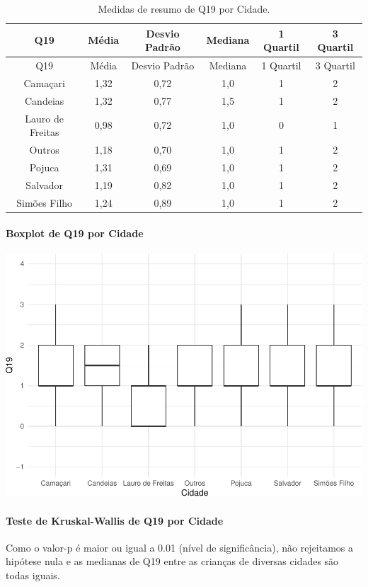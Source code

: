 \documentclass[]{article}
\let\oldparagraph\paragraph
\renewcommand{\paragraph}[1]{\oldparagraph{#1}\mbox{}}
\begin{document}
\begin{longtable}[]{@{}cccccc@{}}
\caption{\label{tab:unnamed-chunk-312}Medidas de resumo de Q19 por Cidade.}\tabularnewline
\toprule
Q19 & Média & Desvio Padrão & Mediana & 1 Quartil & 3 Quartil\tabularnewline
\midrule
\endfirsthead
\toprule
Q19 & Média & Desvio Padrão & Mediana & 1 Quartil & 3 Quartil\tabularnewline
\midrule
\endhead
Camaçari & 1,32 & 0,72 & 1,0 & 1 & 2\tabularnewline
Candeias & 1,32 & 0,77 & 1,5 & 1 & 2\tabularnewline
Lauro de Freitas & 0,98 & 0,72 & 1,0 & 0 & 1\tabularnewline
Outros & 1,18 & 0,70 & 1,0 & 1 & 2\tabularnewline
Pojuca & 1,31 & 0,69 & 1,0 & 1 & 2\tabularnewline
Salvador & 1,19 & 0,82 & 1,0 & 1 & 2\tabularnewline
Simões Filho & 1,24 & 0,89 & 1,0 & 1 & 2\tabularnewline
\bottomrule
\end{longtable}

\hypertarget{boxplot-de-q19-por-cidade}{%
\paragraph{Boxplot de Q19 por Cidade}\label{boxplot-de-q19-por-cidade}}

\begin{center}\includegraphics[width=0.75\linewidth]{relatorio_covid19_files/figure-latex/unnamed-chunk-313-1} \end{center}

\hypertarget{teste-de-kruskal-wallis-de-q19-por-cidade}{%
\paragraph{Teste de Kruskal-Wallis de Q19 por Cidade}\label{teste-de-kruskal-wallis-de-q19-por-cidade}}

Como o valor-p é maior ou igual a 0.01 (nível de significância), não rejeitamos a hipótese nula e as medianas de Q19 entre as crianças de diversas cidades são todas iguais.
\end{document}
